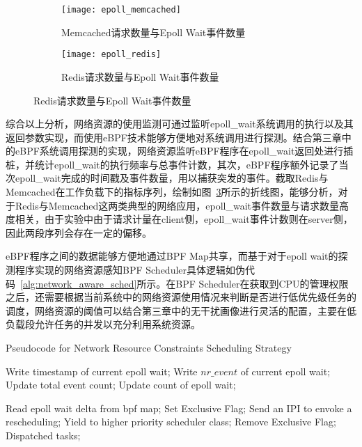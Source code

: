 \begin{figure}[H]
    \centering
    \begin{subfigure}[b]{0.49\textwidth}
        \texttt{[image: epoll\_memcached]}
        \caption{Memcached请求数量与Epoll Wait事件数量}
        \label{fig:epoll_memcached}
    \end{subfigure}
    \begin{subfigure}[b]{0.49\textwidth}
        \texttt{[image: epoll\_redis]}
        \caption{Redis请求数量与Epoll Wait事件数量}
        \label{fig:epoll_redis}
    \end{subfigure}
\label{fig:epoll_request}
\end{figure}

综合以上分析，网络资源的使用监测可通过监听epoll\_wait系统调用的执行以及其返回参数实现，而使用eBPF技术能够方便地对系统调用进行探测。结合第三章中的eBPF系统调用探测的实现，网络资源监听eBPF程序在epoll\_wait返回处进行插桩，并统计epoll\_wait的执行频率与总事件计数，其次，eBPF程序额外记录了当次epoll\_wait完成的时间戳及事件数量，用以捕获突发的事件。截取Redis与Memcached在工作负载下的指标序列，绘制如图~\ref{fig:epoll_request}所示的折线图，能够分析，对于Redis与Memcached这两类典型的网络应用，epoll\_wait事件数量与请求数量高度相关，由于实验中由于请求计量在client侧，epoll\_wait事件计数则在server侧，因此两段序列会存在一定的偏移。

eBPF程序之间的数据能够方便地通过BPF Map共享，而基于对于epoll wait的探测程序实现的网络资源感知BPF Scheduler具体逻辑如伪代码~\ref{alg:network_aware_sched}所示。在BPF Scheduler在获取到CPU的管理权限之后，还需要根据当前系统中的网络资源使用情况来判断是否进行低优先级任务的调度，网络资源的阈值可以结合第三章中的无干扰画像进行灵活的配置，主要在低负载段允许任务的并发以充分利用系统资源。

\begin{algorithm}[H]
    \caption{Pseudocode for Network Resource Constraints Scheduling Strategy}
    \label{alg:network_aware_sched}
    \begin{algorithmic}[1]

        \State Write timestamp of current epoll wait;
        \State Write $nr\_event$ of current epoll wait;
        \State Update total event count;
        \State Update count of epoll wait;
    \EndFunction

            \State Read epoll wait delta from bpf map;
                \State Set Exclusive Flag;
                    \State Send an IPI to envoke a rescheduling;
                \EndFor
                \State Yield to higher priority scheduler class;
            \EndIf
            \State Remove Exclusive Flag;
            \State Dispatched tasks;
        \EndWhile
    \EndFunction
    \end{algorithmic}
\end{algorithm}

